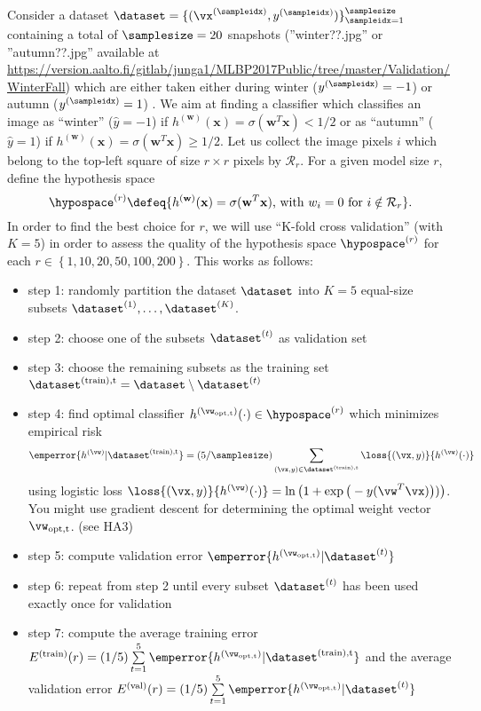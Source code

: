 \documentclass[article,11pt]{article}
\begin{document}
Consider a dataset $\dataset = \{ (\vx^{(\sampleidx)},y^{(\sampleidx)}) \}_{\sampleidx=1}^{\samplesize}$ containing a total of $\samplesize=20$ snapshots 
(''winter??.jpg'' or ''autumn??.jpg'' available at \url{https://version.aalto.fi/gitlab/junga1/MLBP2017Public/tree/master/Validation/WinterFall}) 
which are either taken either during winter ($y^{(\sampleidx)}=-1$) or autumn ($y^{(\sampleidx)}=1$) 
. 
We aim at finding a classifier which classifies an image as ``winter'' ($\hat{y}=-1$) if $h^{(\mathbf{w})}(\mathbf{x}) = \sigma(\mathbf{w}^T \mathbf{x}) <1/2$ or 
as ``autumn''  ($\hat{y}=1$) if $h^{(\mathbf{w})}(\mathbf{x}) = \sigma(\mathbf{w}^T \mathbf{x}) \geq 1/2$. 
Let us collect the image pixels $i$ which belong to the top-left square of size 
$r \times r$ pixels by $\mathcal{R}_{r}$. For a given model size $r$, define the hypothesis space 
\begin{equation}
\hypospace^{(r)} \defeq \{ h^{(\mathbf{w})}(\mathbf{x}) = \sigma(\mathbf{w}^T \mathbf{x}) \mbox{, with } w_{i} = 0 \mbox{ for } i \notin \mathcal{R}_{r} \}.  \nonumber
\end{equation} 
In order to find the best choice for $r$, we will use ``K-fold cross validation'' (with $K=5$) in order to assess the quality of the hypothesis space 
$\hypospace^{(r)}$ for each $r \in \left\lbrace 1,10,20,50,100,200  \right\rbrace $. 
This works as follows: 
\begin{itemize}
\item step 1:  randomly partition the dataset $\dataset$ into $K=5$ equal-size subsets $\dataset^{(1)},\ldots,\dataset^{(K)}$. 
\item step 2:  choose one of the subsets $\dataset^{(t)}$ as validation set 
\item step 3:  choose the remaining subsets as the training set $\dataset^{(\rm train),t} = \dataset \setminus \dataset^{(t)}$ 
\item step 4:  find optimal classifier $h^{(\vw_{\rm opt,t})}(\cdot) \in \hypospace^{(r)}$ which minimizes empirical risk 
\begin{equation} 
\emperror \{ h^{(\vw)} | \dataset^{(\rm train),t} \} = (5/\samplesize) \sum_{(\vx,y) \in \dataset^{(\rm train),t}}  \loss{(\vx,y)}{h^{(\vw)}(\cdot)}  \nonumber%
\end{equation} 
using logistic loss $\loss{(\vx,y)}{h^{(\vw)}(\cdot)}=\ln\big(1 + \exp\big(- y (\vw^{T} \vx)\big))\big)$. 
You might use gradient descent for determining the optimal weight vector $\vw_{\rm opt,t}$. (see HA3) 
\item step 5:  compute validation error $\emperror \{ h^{(\vw_{\rm opt,t})} | \dataset^{(t)} \}$ 
\item step 6: repeat from step 2 until every subset $\dataset^{(t)}$ has been used exactly once for validation 
\item step 7: compute the average training error $E^{(\rm train)}(r) = (1/5) \sum\limits_{t=1}^{5} \emperror \{ h^{(\vw_{\rm opt,t})} | \dataset^{(\rm train),t} \}$ 
and the average validation error $E^{(\rm val)}(r) = (1/5) \sum\limits_{t=1}^{5} \emperror \{ h^{(\vw_{\rm opt,t})} | \dataset^{(t)} \}$
\end{itemize} 
\end{document}

